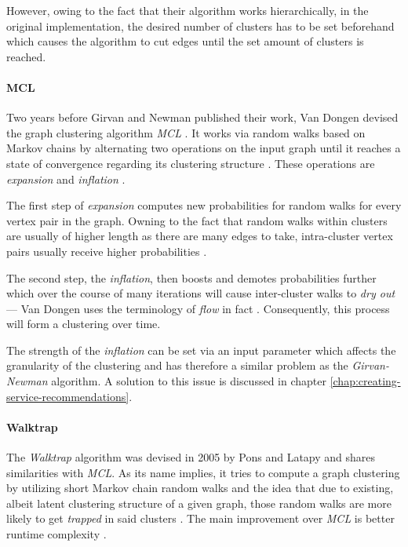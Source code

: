 \documentclass[12pt,a4paper]{report}
\begin{document}
However, owing to the fact that their algorithm works hierarchically,
in the original implementation, the desired number of clusters has to be set
beforehand which causes the algorithm to cut edges until the set amount of
clusters is reached.

\paragraph{MCL \cite{vandongen2000graph}}
Two years before Girvan and Newman published their work, Van Dongen devised
the graph clustering algorithm \textit{MCL} \cite{vandongen2000graph}.
It works via random walks based on Markov chains by alternating two operations
on the input graph until it reaches a state of convergence regarding its
clustering structure \cite{vandongen2000graph}. These operations are
\textit{expansion} and \textit{inflation} \cite{vandongen2000graph}.

The first step of \textit{expansion} computes new probabilities for random walks
for every vertex pair in the graph. Owning to the fact that random walks within
clusters are usually of higher length as there are many edges to take, intra-cluster
vertex pairs usually receive higher probabilities \cite{vandongen2000graph}.

The second step, the \textit{inflation}, then boosts and demotes probabilities
further which over the course of many iterations will cause inter-cluster walks
to \textit{dry out} --- Van Dongen uses the terminology of \textit{flow} in fact
\cite{vandongen2000graph}. Consequently, this process will form a clustering
over time.

The strength of the \textit{inflation} can be set via an input parameter which
affects the granularity of the clustering and has therefore a similar problem
as the \textit{Girvan-Newman} algorithm. A solution to this issue is discussed
in chapter \ref{chap:creating-service-recommendations}.

\paragraph{Walktrap \cite{pons2005computing}}
The \textit{Walktrap} algorithm was devised in 2005 by Pons and Latapy
\cite{pons2005computing} and shares similarities with \textit{MCL}.
As its name implies, it tries to compute a graph clustering by utilizing short
Markov chain random walks and the idea that due to existing, albeit latent
clustering structure of a given graph, those random walks are more likely
to get \textit{trapped} in said clusters \cite{pons2005computing}.
The main improvement over \textit{MCL} is better runtime complexity
\cite{pons2005computing}.
\end{document}
